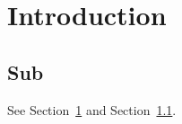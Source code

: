 \documentclass{aastex7}
\begin{document}
\section{Introduction}\label{sec:intro}
\subsection{Sub}\label{sec:sub}
See Section~\ref{sec:intro} and Section~\ref{sec:sub}.
\end{document}
